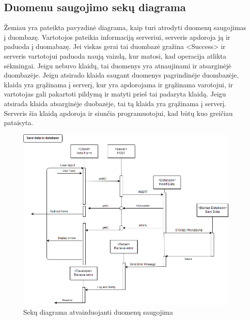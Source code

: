 \documentclass{VUMIFPSkursinis}
\begin{document}
		\subsection{Duomenu saugojimo sekų diagrama} 
		Žemiau yra pateikta pavyzdinė diagrama, kaip turi atrodyti duomenų saugojimas į duombazę. Vartotojos pateikia informaciją serveriui, serveris apdoroja ją ir paduoda į duomabazę. Jei viskas gerai tai duombazė gražina <Success> ir serveris vartotojui paduoda naują vaizdą, kur matosi, kad operacija atlikta sėkmingai. Jeigu nebuvo klaidų, tai duomenys yra atnaujinami ir atsarginėjė duombazėje. Jeigu atsirado klaida saugant duomenys pagrindinėje duombazėje, klaida yra grąžinama į serverį, kur yra apdorojama ir grąžinama varotojui, ir vartotojas gali pakartoti pildymą ir matyti prieš tai padaryta klaidą. Jeigu atsirada klaida atsarginėje duobazėje, tai tą klaida yra grąžinama į serverį. Serveris šia klaidą apdoroja ir siunčia programuotojui, kad būtų kuo greičiau pataisyta. 
		\begin{figure}[H]
			\centering
			\includegraphics[width=\textwidth]{img/PSI5/SavingSequence.png}
			\caption{Sekų diagrama atvaizduojanti duomenų saugojima}
			\label{fig:saugojimo}
		\end{figure}
		
\end{document}

